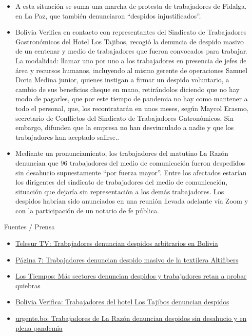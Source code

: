 \documentclass[a4paper, nobind]{templates/ociamthesis}
\begin{document}
\begin{itemize}
\item
  A esta situación se suma una marcha de protesta de trabajadores de Fidalga, en La Paz, que también denunciaron ``despidos injustificados''.
\item
  Bolivia Verifica en contacto con representantes del Sindicato de Trabajadores Gastronómicos del Hotel Los Tajibos, recogió la denuncia de despido masivo de un centenar y medio de trabajadores que fueron convocados para trabajar. La modalidad: llamar uno por uno a los trabajadores en presencia de jefes de área y recursos humanos, incluyendo al mismo gerente de operaciones Samuel Doria Medina junior, quienes instigan a firmar un despido voluntario, a cambio de sus beneficios cheque en mano, retirándolos diciendo que no hay modo de pagarles, que por este tiempo de pandemia no hay como mantener a todo el personal, que, los recontratarán en unos meses, según Maycol Erasmo, secretario de Conflictos del Sindicato de Trabajadores Gatronómicos. Sin embargo, difunden que la empresa no han desvinculado a nadie y que los trabajadores han aceptado salirse..
\item
  Mediante un pronunciamiento, los trabajadores del matutino La Razón denuncian que 96 trabajadores del medio de comunicación fueron despedidos sin desahucio supuestamente ``por fuerza mayor''. Entre los afectados estarían los dirigentes del sindicato de trabajadores del medio de comunicación, situación que dejaría sin representación a los demás trabajadores. Los despidos habrían sido anunciados en una reunión llevada adelante vía Zoom y con la participación de un notario de fe pública.
\end{itemize}

Fuentes / Prensa

\begin{itemize}
\item
  \href{https://www.telesurtv.net/news/trabajadores-denuncian-despidos-masivos-bolivia-20200514-0030.html}{Telesur TV: Trabajadores denuncian despidos arbitrarios en Bolivia}
\item
  \href{https://www.paginasiete.bo/economia/2020/5/12/trabajadores-denuncian-despido-masivo-de-la-textilera-altifibers-255317.html\#!}{Página 7: Trabajadores denuncian despido masivo de la textilera Altifibers}
\item
  \href{https://www.lostiempos.com/actualidad/economia/20200616/mas-sectores-denuncian-despidos-trabajadores-retan-probar-quiebras}{Los Tiempos: Más sectores denuncian despidos y trabajadores retan a probar quiebras}
\item
  \href{https://boliviaverifica.bo/trabajadores-del-hotel-los-tajibos-denuncian-despedidos/}{Bolivia Verifica: Trabajadores del hotel Los Tajibos denuncian despidos}
\item
  \href{https://urgente.bo/noticia/trabajadores-de-la-raz\%C3\%B3n-denuncian-despidos-sin-desahucio-y-en-plena-pandemia}{urgente.bo: Trabajadores de La Razón denuncian despidos sin desahucio y en plena pandemia}
\end{itemize}
\end{document}
